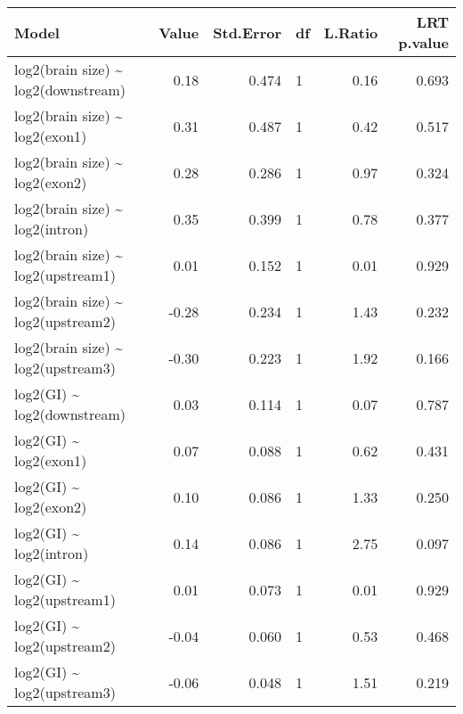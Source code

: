 \begin{table}[ht]
\centering
\begin{tabular}{lrrlrr}
  \hline
Model & Value & Std.Error & df & L.Ratio & LRT p.value \\ 
  \hline
log2(brain size) \~{} log2(downstream) & 0.18 & 0.474 & 1 & 0.16 & 0.693 \\ 
  log2(brain size) \~{} log2(exon1) & 0.31 & 0.487 & 1 & 0.42 & 0.517 \\ 
  log2(brain size) \~{} log2(exon2) & 0.28 & 0.286 & 1 & 0.97 & 0.324 \\ 
  log2(brain size) \~{} log2(intron) & 0.35 & 0.399 & 1 & 0.78 & 0.377 \\ 
  log2(brain size) \~{} log2(upstream1) & 0.01 & 0.152 & 1 & 0.01 & 0.929 \\ 
  log2(brain size) \~{} log2(upstream2) & -0.28 & 0.234 & 1 & 1.43 & 0.232 \\ 
  log2(brain size) \~{} log2(upstream3) & -0.30 & 0.223 & 1 & 1.92 & 0.166 \\ 
   \hline
log2(GI) \~{} log2(downstream) & 0.03 & 0.114 & 1 & 0.07 & 0.787 \\ 
  log2(GI) \~{} log2(exon1) & 0.07 & 0.088 & 1 & 0.62 & 0.431 \\ 
  log2(GI) \~{} log2(exon2) & 0.10 & 0.086 & 1 & 1.33 & 0.250 \\ 
  log2(GI) \~{} log2(intron) & 0.14 & 0.086 & 1 & 2.75 & 0.097 \\ 
  log2(GI) \~{} log2(upstream1) & 0.01 & 0.073 & 1 & 0.01 & 0.929 \\ 
  log2(GI) \~{} log2(upstream2) & -0.04 & 0.060 & 1 & 0.53 & 0.468 \\ 
  log2(GI) \~{} log2(upstream3) & -0.06 & 0.048 & 1 & 1.51 & 0.219 \\ 
   \hline
\end{tabular}
\end{table}
